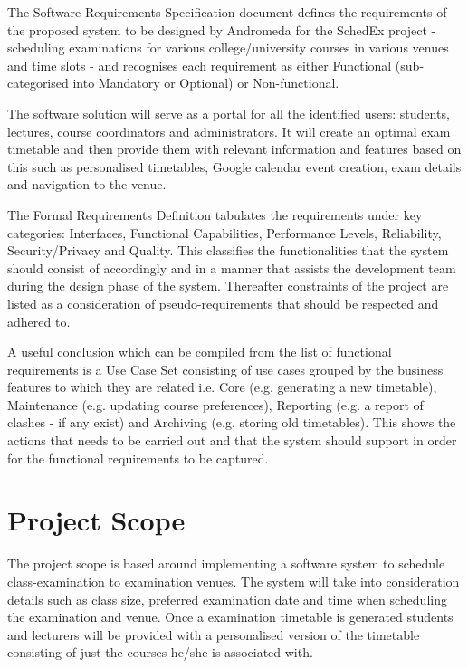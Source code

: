 \documentclass{article}
\begin{document}
The Software Requirements Specification document defines the requirements of the proposed system to be designed by Andromeda for the SchedEx project - scheduling examinations for various college/university courses in various venues and time slots - and recognises each requirement as either Functional (sub-categorised into Mandatory or Optional) or Non-functional.

The software solution will serve as a portal for all the identified users: students, lectures, course coordinators and administrators. It will create an optimal exam timetable and then provide them with relevant information and features based on this such as personalised timetables, Google calendar event creation, exam details and navigation to the venue.

The Formal Requirements Definition tabulates the requirements under key categories: Interfaces, Functional Capabilities, Performance Levels, Reliability, Security/Privacy and Quality. This classifies the functionalities that the system should consist of accordingly and in a manner that assists the development team during the design phase of the system. Thereafter constraints of the project are listed as a consideration of pseudo-requirements that should be respected and adhered to.

A useful conclusion which can be compiled from the list of functional requirements is a Use Case Set consisting of use cases grouped by the business features to which they are related i.e. Core (e.g. generating a new timetable), Maintenance (e.g. updating course preferences), Reporting (e.g. a report of clashes - if any exist) and Archiving (e.g. storing old timetables). This shows the actions that needs to be carried out and that the system should support in order for the functional requirements to be captured.

\section{Project Scope}

The project scope is based around implementing a software system to schedule class-examination to examination venues. The system will take into consideration details such as class size, preferred examination date and time when scheduling the examination and venue. Once a examination timetable is generated students and lecturers will be provided with a personalised version of the timetable consisting of just the courses he/she is associated with. 
\end{document}
